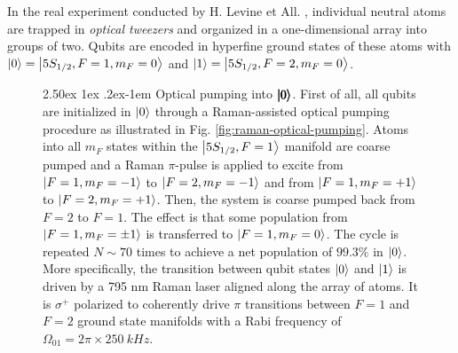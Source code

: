 \documentclass[rmp,10pt,onecolumn,fleqn,notitlepage]{revtex4-1}
\makeatletter
\renewcommand{\paragraph}{%
    \@startsection{paragraph}{4}%
    {\z@}{2.50ex \@plus 1ex \@minus .2ex}{-1em}%
    {\bf\sffamily}%
}
\makeatother
\begin{document}
In the real experiment conducted by H. Levine et All. \cite{PhysRevLett.123.170503}, individual neutral atoms are trapped in \textit{optical tweezers} and organized in a one-dimensional array into groups of two. Qubits are encoded in hyperfine ground states of these atoms with $\left\vert{0}\right\rangle=\left\vert{5 S_{1/2}, F=1, m_F=0 }\right\rangle$ and $\left\vert{1}\right\rangle=\left\vert{5 S_{1/2}, F=2, m_F=0 }\right\rangle$. 


\begin{figure}[H]
    \fontsize{10pt}{12pt}\selectfont
    \begin{minipage}{0.5\linewidth}\setlength{\parindent}{9pt}
    \paragraph{Optical pumping into $\pmb{\left\vert{0}\right\rangle}$.} First of all, all qubits are initialized in $\left\vert{0}\right\rangle$ through a Raman-assisted optical pumping procedure as illustrated in Fig. \ref{fig:raman-optical-pumping}. Atoms into all $m_F$ states within the $\left\vert{5 S_{1/2}, F=1}\right\rangle$ manifold are coarse pumped and a Raman $\pi$-pulse is applied to excite from $\left\vert{F=1,m_F=-1}\right\rangle$ to $\left\vert{F=2,m_F=-1}\right\rangle$ and from $\left\vert{F=1,m_F=+1}\right\rangle$ to $\left\vert{F=2,m_F=+1}\right\rangle$. Then, the system is coarse pumped back from $F=2$ to $F=1$. The effect is that some population from $\left\vert{F=1,m_F=\pm 1}\right\rangle$ is transferred to $\left\vert{F=1,m_F=0}\right\rangle$. The cycle is repeated $N \sim 70$ times to achieve a net population of $99.3\%$ in $\left\vert{0}\right\rangle$.
    More specifically, the transition between qubit states $\left\vert{0}\right\rangle$ and $\left\vert{1}\right\rangle$ is driven by a 795 nm Raman laser aligned along the array of atoms. It is $\sigma^+$ polarized to coherently drive $\pi$ transitions between $F=1$ and $F=2$ ground state manifolds with a Rabi frequency of $\Omega_{01}= 2 \pi \times \SI{250}{kHz}$. 
    \end{minipage}
    \hfill
    \begin{minipage}{0.45\linewidth}
    \centering

\end{minipage}
\end{figure}
\end{document}
